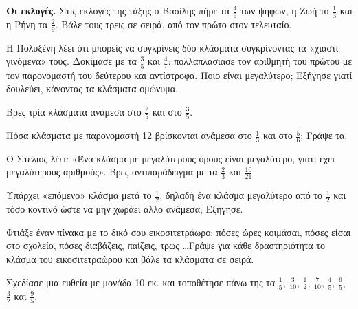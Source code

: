 \ex \textbf{Οι εκλογές.} Στις εκλογές της τάξης ο Βασίλης πήρε τα $\frac{4}{9}$ των ψήφων, η Ζωή το $\frac{1}{3}$ και η Ρήνη τα $\frac{2}{9}$. Βάλε τους τρεις σε σειρά, από τον πρώτο στον τελευταίο.


\ex Η Πολυξένη λέει ότι μπορείς να συγκρίνεις δύο κλάσματα συγκρίνοντας τα «χιαστί γινόμενά» τους. Δοκίμασε με τα $\frac{3}{5}$ και $\frac{4}{7}$: πολλαπλασίασε τον αριθμητή του πρώτου με τον παρονομαστή του δεύτερου και αντίστροφα. Ποιο είναι μεγαλύτερο; Εξήγησε γιατί δουλεύει, κάνοντας τα κλάσματα ομώνυμα.

\ex Βρες τρία κλάσματα ανάμεσα στο $\frac{2}{5}$ και στο $\frac{3}{5}$.

\ex Πόσα κλάσματα με παρονομαστή 12 βρίσκονται ανάμεσα στο $\frac{1}{3}$ και στο $\frac{5}{6}$; Γράψε τα.

\ex Ο Στέλιος λέει: «Ένα κλάσμα με μεγαλύτερους όρους είναι μεγαλύτερο, γιατί έχει μεγαλύτερους αριθμούς». Βρες αντιπαράδειγμα με τα $\frac{2}{3}$ και $\frac{10}{21}$.

\ex Υπάρχει «επόμενο» κλάσμα μετά το $\frac{1}{2}$, δηλαδή ένα κλάσμα μεγαλύτερο από το $\frac{1}{2}$ και τόσο κοντινό ώστε να μην χωράει άλλο ανάμεσα; Εξήγησε.


\ex Φτιάξε έναν πίνακα με το δικό σου εικοσιτετράωρο: πόσες ώρες κοιμάσαι, πόσες είσαι στο σχολείο, πόσες διαβάζεις, παίζεις, τρως \dots Γράψε για κάθε δραστηριότητα το κλάσμα του εικοσιτετραώρου και βάλε τα κλάσματα σε σειρά.

\ex Σχεδίασε μια ευθεία με μονάδα 10 εκ. και τοποθέτησε πάνω της τα $\frac{1}{5}$, $\frac{3}{10}$, $\frac{1}{2}$, $\frac{7}{10}$, $\frac{4}{5}$, $\frac{6}{5}$, $\frac{3}{2}$ και $\frac{9}{5}$.
